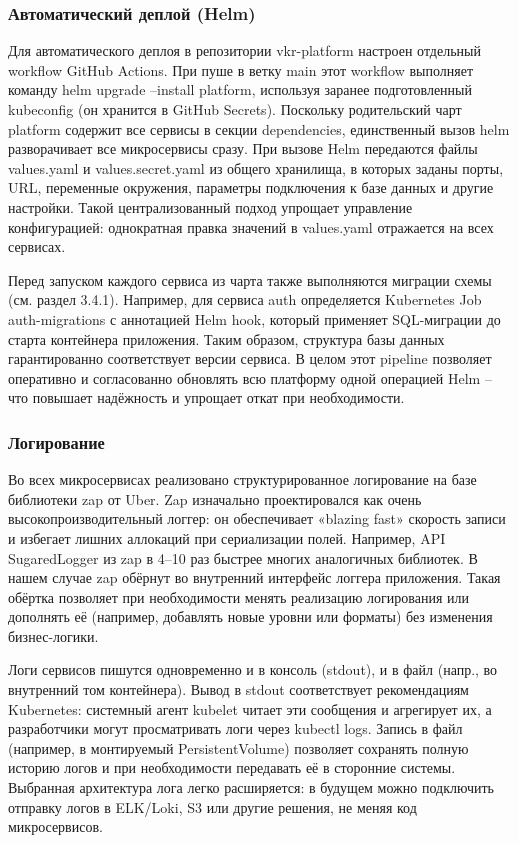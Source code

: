 \subsubsection*{Автоматический деплой (Helm)}
Для автоматического деплоя в репозитории vkr-platform настроен отдельный workflow GitHub Actions. При пуше в ветку main этот workflow выполняет команду helm upgrade --install platform, используя заранее подготовленный kubeconfig (он хранится в GitHub Secrets). Поскольку родительский чарт platform содержит все сервисы в секции dependencies, единственный вызов helm разворачивает все микросервисы сразу. При вызове Helm передаются файлы values.yaml и values.secret.yaml из общего хранилища, в которых заданы порты, URL, переменные окружения, параметры подключения к базе данных и другие настройки. Такой централизованный подход упрощает управление конфигурацией: однократная правка значений в values.yaml отражается на всех сервисах.

Перед запуском каждого сервиса из чарта также выполняются миграции схемы (см. раздел 3.4.1). Например, для сервиса auth определяется Kubernetes Job auth-migrations с аннотацией Helm hook, который применяет SQL-миграции до старта контейнера приложения. Таким образом, структура базы данных гарантированно соответствует версии сервиса. В целом этот pipeline позволяет оперативно и согласованно обновлять всю платформу одной операцией Helm – что повышает надёжность и упрощает откат при необходимости.

\subsubsection*{Логирование}
Во всех микросервисах реализовано структурированное логирование на базе библиотеки zap от Uber. Zap изначально проектировался как очень высокопроизводительный логгер: он обеспечивает «blazing fast» скорость записи и избегает лишних аллокаций при сериализации полей. Например, API SugaredLogger из zap в 4–10 раз быстрее многих аналогичных библиотек. В нашем случае zap обёрнут во внутренний интерфейс логгера приложения. Такая обёртка позволяет при необходимости менять реализацию логирования или дополнять её (например, добавлять новые уровни или форматы) без изменения бизнес-логики.

Логи сервисов пишутся одновременно и в консоль (stdout), и в файл (напр., во внутренний том контейнера). Вывод в stdout соответствует рекомендациям Kubernetes: системный агент kubelet читает эти сообщения и агрегирует их, а разработчики могут просматривать логи через kubectl logs. Запись в файл (например, в монтируемый PersistentVolume) позволяет сохранять полную историю логов и при необходимости передавать её в сторонние системы. Выбранная архитектура лога легко расширяется: в будущем можно подключить отправку логов в ELK/Loki, S3 или другие решения, не меняя код микросервисов.

